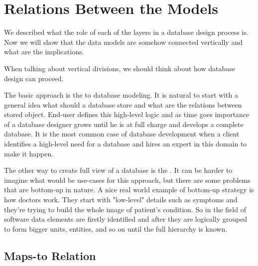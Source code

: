 
\section{Relations Between the Models}

We described what the role of each of the layers in a database design process is.
Now we will show that the data models are somehow connected vertically and what are the implications.

When talking about vertical divisions, we should think about how database design can proceed.

The basic approach is the  to database modeling.
It is natural to start with a general idea what should a database store and what are the relations between stored object. 
End-user defines this high-level logic and as time goes importance of a database designer grows until he is at full charge and develops a complete database. It is the most common case of database development when a client identifies a high-level need for a database and hires an expert in this domain to make it happen.

The other way to create full view of a database is the . It can be harder to imagine what would be use-cases for this approach, but there are some problems that are bottom-up in nature. A nice real world example of bottom-up strategy is how doctors work. 
They start with "low-level" details such as symptoms and they're trying to build the whole image of patient's condition. So in the field of software data elements are firstly identified and after they are logically grouped to form bigger units, entities, and so on until the full hierarchy is known.

\subsection{Maps-to Relation}

